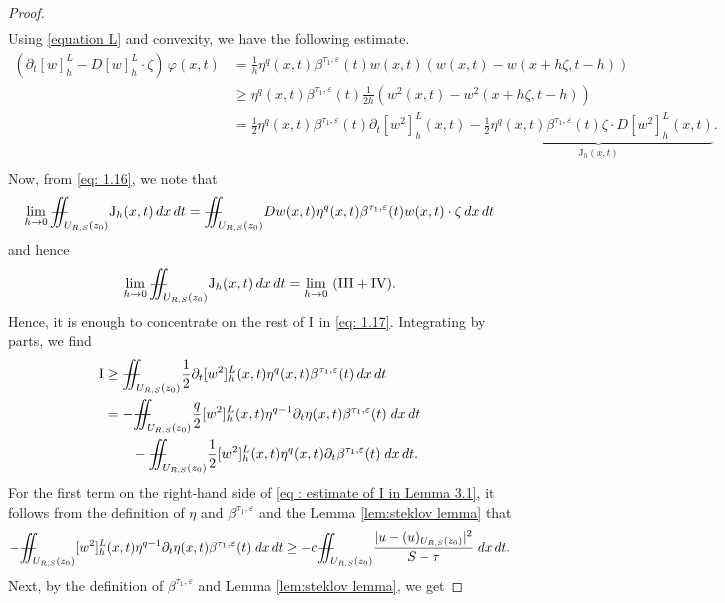 \documentclass[notitlepage,11pt,reqno]{amsart}
\theoremstyle{definition}
\numberwithin{equation}{section}
\newcommand{\iintss}{{\int\hspace{-0.28cm}\int}}
\newcommand{ \miints }{{\iintss\hspace{-0.56cm} -\hspace{-0.15cm}-}}
\newcommand{\miint}[1]{{\miints_{\hspace{-0.13cm}#1}}}
\begin{document}
\begin{proof}
\begin{align}
\end{align} Using \eqref{equation L} and convexity, we have the following estimate.
\begin{align}\label{eq: 1.17}
   ( \partial_t[w]^L_h-D[w]^L_h\cdot \zeta)\, \varphi (x, t)&=\frac{1}{h}\eta^q(x, t)\beta^{\tau_1, \varepsilon}(t)w(x, t)\left(w(x, t)-w(x+h\zeta, t-h)\right)\nonumber\\
    &\geq \eta^q(x, t)\beta^{\tau_1, \varepsilon}(t)\frac{1}{2h}\left(w^2(x, t)-w^2(x+h\zeta, t-h)\right)\nonumber\\
    &=\frac{1}{2}\eta^q(x, t)\beta^{\tau_1, \varepsilon}(t)\partial_t[w^2]^L_h(x, t)-\underbrace{\frac{1}{2}\eta^q(x, t)\beta^{\tau_1, \varepsilon}(t)\zeta \cdot D[w^2]^L_h(x, t)}_{\mathrm {J}_h(x, t)}.\nonumber\\
\end{align}
Now, from \eqref{eq: 1.16}, we note that
\begin{align*}
    \lim_{h\to 0}\miint{U_{R, S}(z_0)} \mathrm{J}_h(x, t)\, dx\, dt=\miint{U_{R, S}(z_0)}Dw(x, t) \eta^q (x, t) \beta^{\tau_1, \varepsilon}(t)w(x, t)\cdot \zeta\, dx\, dt
\end{align*}
and hence
\begin{align*}
    \lim_{h\to 0}\miint{U_{R, S}(z_0)}\mathrm{J}_h(x,t) \, dx\, dt=\lim_{h\to 0}\,\,(\mathrm{III}+\mathrm{IV}).
\end{align*}
Hence, it is enough to concentrate on the rest of $\mathrm{I}$ in \eqref{eq: 1.17}.
Integrating by parts, we find 
\begin{align}\nonumber
\mathrm{I}&\geq \miint{U_{R,S}(z_0)} \frac{1}{2}\partial_t[w^2]^L_h(x, t)\eta^{q}(x, t)\beta^{\tau_1, \varepsilon}(t)\, dx\, dt\\\label{eq : estimate of I in Lemma 3.1}
&=-\miint{U_{R,S}(z_0)} \frac{q}{2}[w^2]^L_h(x, t)\eta^{q-1}\partial_t \eta(x, t)\beta^{\tau_1, \varepsilon}(t) \;dx\, dt\\\nonumber
&\qquad-\miint{U_{R,S}(z_0)} \frac{1}{2}[w^2]^L_h(x, t) \eta^q(x, t) \partial_t \beta^{\tau_1, \varepsilon}(t) \; dx\, dt.
    \end{align}
    For the first term on the right-hand side of \eqref{eq : estimate of I in Lemma 3.1}, it follows from the definition of $\eta$ and $\beta^{\tau_1, \varepsilon}$ and the Lemma \ref{lem:steklov lemma} that
    $$
    -\miint{U_{R,S}(z_0)} [w^2]^L_h(x, t)\eta^{q-1}\partial_t\eta(x, t)\beta^{\tau_1, \varepsilon}(t)\;dx\, dt\geq -c \miint{U_{R,S}(z_0)}\frac{|u-(u)_{U_{R,S}(z_0)}|^2}{S-\tau} \; dx\, dt.
    $$
    Next, by the definition of $\beta^{\tau_1, \varepsilon}$ and Lemma \ref{lem:steklov lemma}, we get 

\end{proof}
\end{document}

